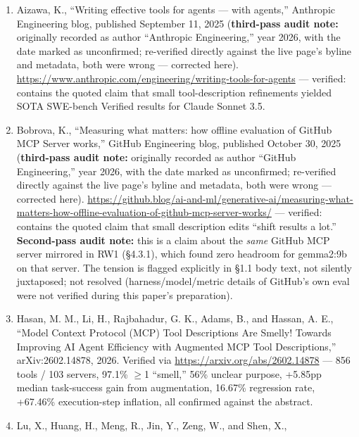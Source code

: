 \begin{itemize}
  \begin{enumerate}
  \def\labelenumi{\arabic{enumi}.}
  \tightlist
  \item
    Aizawa, K., ``Writing effective tools for agents --- with agents,''
    Anthropic Engineering blog, published September 11, 2025 (\textbf{third-pass
    audit note:} originally recorded as author ``Anthropic Engineering,''
    year 2026, with the date marked as unconfirmed; re-verified directly
    against the live page's byline and metadata, both were wrong ---
    corrected here).
    \url{https://www.anthropic.com/engineering/writing-tools-for-agents}
    --- verified: contains the quoted claim that small tool-description
    refinements yielded SOTA SWE-bench Verified results for Claude
    Sonnet 3.5. \nocite{anthropic2025tools}
  \item
    Bobrova, K., ``Measuring what matters: how offline evaluation
    of GitHub MCP Server works,'' GitHub Engineering blog, published
    October 30, 2025 (\textbf{third-pass audit note:} originally recorded as
    author ``GitHub Engineering,'' year 2026, with the date marked as
    unconfirmed; re-verified directly against the live page's byline and
    metadata, both were wrong --- corrected here).
    \url{https://github.blog/ai-and-ml/generative-ai/measuring-what-matters-how-offline-evaluation-of-github-mcp-server-works/}
    --- verified: contains the quoted claim that small description edits
    ``shift results a lot.'' \textbf{Second-pass audit note:} this is a
    claim about the \emph{same} GitHub MCP server mirrored in RW1
    (§4.3.1), which found zero headroom for gemma2:9b on that server.
    The tension is flagged explicitly in §1.1 body text, not silently
    juxtaposed; not resolved (harness/model/metric details of GitHub's
    own eval were not verified during this paper's preparation). \nocite{github2025measuring}
  \item
    Hasan, M. M., Li, H., Rajbahadur, G. K., Adams, B., and Hassan, A.
    E., ``Model Context Protocol (MCP) Tool Descriptions Are Smelly!
    Towards Improving AI Agent Efficiency with Augmented MCP Tool
    Descriptions,'' arXiv:2602.14878, 2026. Verified via
    \url{https://arxiv.org/abs/2602.14878} --- 856 tools / 103 servers,
    97.1\% $\geq$1 ``smell,'' 56\% unclear purpose, +5.85pp median
    task-success gain from augmentation, 16.67\% regression rate,
    +67.46\% execution-step inflation, all confirmed against the
    abstract. \nocite{hasan2026smelly}
  \item
    Lu, X., Huang, H., Meng, R., Jin, Y., Zeng, W., and Shen, X.,

\end{enumerate}
\end{itemize}
